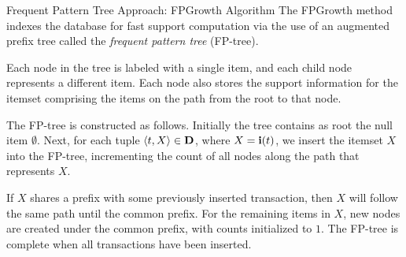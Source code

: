 \begin{frame}{Frequent Pattern Tree Approach: FPGrowth Algorithm}
The FPGrowth method indexes the database for fast support
computation via the use of an augmented pref\/{i}x tree called the
{\em frequent pattern tree} (FP-tree).  

\medskip
Each
node in the tree is labeled with a single item, and each child node
represents a different item. Each node also stores the support
information for the itemset comprising the items on the path from the
root to that node. 

\medskip
The FP-tree is constructed as follows.
Initially the tree contains as root the null item
$\emptyset$. Next, for each tuple
$\langle t, X \rangle \in \mathbf{D}$, where $X={\mathbf{i}}(t)$,
we insert the itemset $X$ into the FP-tree,
incrementing the count of all nodes
along the path that represents $X$.

\medskip
If $X$ shares a pref\/{i}x with some previously inserted
transaction, then $X$ will follow the same path until the common
pref\/{i}x. For the remaining items in $X$, new nodes are created
under the common pref\/{i}x, with counts initialized to $1$. The
FP-tree is complete when all transactions have been inserted.
\end{frame}



